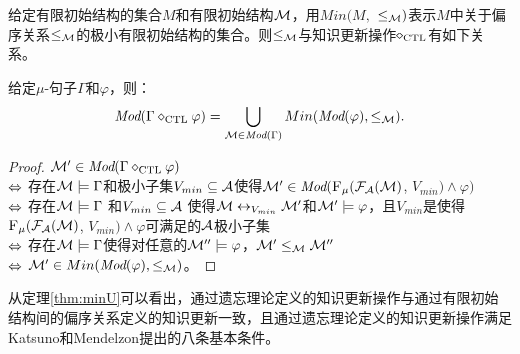 给定有限初始结构的集合$M$和有限初始结构${\cal M}$，用$Min(M,$ $\leq_{{\cal M}})$表示$M$中关于偏序关系$\leq_{{\cal M}}$的极小有限初始结构的集合。则$\leq_{{\cal M}}$与知识更新操作$\diamond_{\textrm{CTL}}$有如下关系。

\begin{theorem}\label{thm:minU}
	给定$\mu$-句子$\Gamma$和$\varphi$，则：
	\[\textit{Mod}(\Gamma \diamond_{\textrm{CTL}} \varphi) = \bigcup_{{\cal M}\in \textit{Mod}(\Gamma)} Min(\textit{Mod}(\varphi), \leq_{{\cal M}}).
	\]
\end{theorem}
\begin{proof}
	${\cal M}'\in \textit{Mod}(\Gamma \diamond_{\textrm{CTL}} \varphi)$\\
	$\Leftrightarrow$ 存在${\cal M} \models \Gamma$和极小子集$V_{min} \subseteq {\cal A}$使得${\cal M}' \in \textit{Mod}({\textsc{F}_{\textsc{$\mu$}}}({\cal F}_{{\cal A}}({\cal M})$, $V_{min}) \wedge \varphi)$\\
	$\Leftrightarrow$ 存在${\cal M} \models \Gamma$ 和$V_{min}\subseteq {\cal A}$ 使得${\cal M} \leftrightarrow_{V_{min}} {\cal M}'$和${\cal M}' \models \varphi$，且$V_{min}$是使得${\textsc{F}_{\textsc{$\mu$}}}({\cal F}_{{\cal A}}({\cal M})$, $V_{min}) \wedge \varphi$可满足的${\cal A}$极小子集\\
	$\Leftrightarrow$ 存在${\cal M} \models \Gamma$使得对任意的${\cal M}''\models \varphi$，${\cal M}' \leq_{{\cal M}} {\cal M}''$\\
	$\Leftrightarrow$ ${\cal M}' \in Min(\textit{Mod}(\varphi), \leq_{{\cal M}})$。
\end{proof}


从定理\ref{thm:minU}可以看出，通过遗忘理论定义的知识更新操作与通过有限初始结构间的偏序关系定义的知识更新一致，且通过遗忘理论定义的知识更新操作满足Katsuno和Mendelzon提出的八条基本条件。


